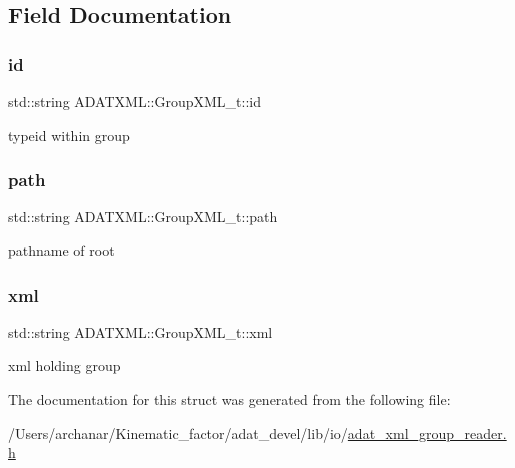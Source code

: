 \subsection{Field Documentation}
\mbox{\label{structADATXML_1_1GroupXML__t_a618530d5beb151a6c2993555d604bd6b}} 
\subsubsection{\texorpdfstring{id}{id}}
{\footnotesize\ttfamily std\+::string A\+D\+A\+T\+X\+M\+L\+::\+Group\+X\+M\+L\+\_\+t\+::id}

typeid within group \mbox{\label{structADATXML_1_1GroupXML__t_a3dcdc0c3e78cfa5f84c28f79407c4ad2}} 
\subsubsection{\texorpdfstring{path}{path}}
{\footnotesize\ttfamily std\+::string A\+D\+A\+T\+X\+M\+L\+::\+Group\+X\+M\+L\+\_\+t\+::path}

pathname of root \mbox{\label{structADATXML_1_1GroupXML__t_aa55c46630f1b4fa95f642c24a46e8323}} 
\subsubsection{\texorpdfstring{xml}{xml}}
{\footnotesize\ttfamily std\+::string A\+D\+A\+T\+X\+M\+L\+::\+Group\+X\+M\+L\+\_\+t\+::xml}

xml holding group 

The documentation for this struct was generated from the following file\+:\begin{DoxyCompactItemize}
\item 
/\+Users/archanar/\+Kinematic\+\_\+factor/adat\+\_\+devel/lib/io/\mbox{\hyperlink{lib_2io_2adat__xml__group__reader_8h}{adat\+\_\+xml\+\_\+group\+\_\+reader.\+h}}\end{DoxyCompactItemize}
